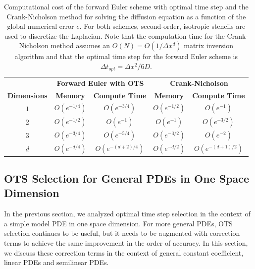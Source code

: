 \documentclass[fleqn,12pt,twoside]{article}
\def\dt{\Delta t}
\def\dx{\Delta x}
\def\dto{\dt_{opt}}
\begin{document}
\begin{table}[tb]
\caption{
Computational cost of the forward Euler scheme with optimal time step and 
the Crank-Nicholson method for solving the diffusion equation as a function 
of the global numerical error $e$.
For both schemes, second-order, isotropic stencils are used to discretize 
the Laplacian.  
Note that the computation time for the Crank-Nicholson method assumes an 
$O(N) = O \left( 1/\dx^d \right)$ matrix inversion algorithm 
and that the optimal time step for the forward Euler scheme is 
$\dto = \dx^2/6D$.
}
\label{tab:comp_perf_vs_dim}
\renewcommand{\arraystretch}{1.5}
\begin{tabular}{ccccc}
  \hline
  & \multicolumn{2}{c}{\bf Forward Euler with OTS} 
  & \multicolumn{2}{c}{\bf Crank-Nicholson} \\
  \cline{2-3} \cline{4-5} 
    {\bf Dimensions} & {\bf Memory} & {\bf Compute Time} 
  & {\bf Memory} & {\bf Compute Time} \\
  \hline 
  $1$ & $O\left( e^{-1/4} \right)$ 
      & $O\left( e^{-3/4} \right)$ 
      & $O\left( e^{-1/2} \right)$ 
      & $O\left( e^{-1} \right)$ \\ 
  $2$ & $O\left( e^{-1/2} \right)$ 
      & $O\left( e^{-1} \right)$ 
      & $O\left( e^{-1} \right)$ 
      & $O\left( e^{-3/2} \right)$ \\ 
  $3$ & $O\left( e^{-3/4} \right)$ 
      & $O\left( e^{-5/4} \right)$ 
      & $O\left( e^{-3/2} \right)$ 
      & $O\left( e^{-2} \right)$ \\
  $d$ & $O\left( e^{-d/4} \right)$ 
      & $O\left( e^{-(d+2)/4} \right)$ 
      & $O\left( e^{-d/2} \right)$ 
      & $O\left( e^{-(d+1)/2} \right)$ \\ 
  \hline 
\end{tabular}
\end{table}



\subsection{\label{sec:ots_general_1d_pdes} 
            OTS Selection for General PDEs in One Space Dimension} 
In the previous section, we analyzed optimal time step selection in the 
context of a simple model PDE in one space dimension.  For more general PDEs, 
OTS selection continues to be useful, but it needs to be augmented with 
correction terms to achieve the same improvement in the order of accuracy.  
In this section, we discuss these correction terms in the context of general 
constant coefficient, linear PDEs and semilinear PDEs. 
\end{document}
